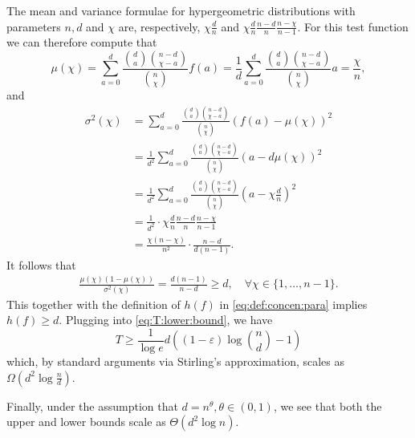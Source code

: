 \documentclass[onecolumn,letterpaper]{IEEEtran}
\newcommand{\na}{{a}}
\newcommand{\plsize}{{\chi}}
\newcommand{\mean}{{\mu}}
\newcommand{\var}{{\sigma^{2}}}
\newcommand{\fh}{{h(f)}}
\begin{document}
\begin{IEEEproof}
The mean and variance formulae for hypergeometric distributions with parameters $n, d$ and $\plsize$ are, respectively, $\plsize \frac d n$  and $\plsize \frac {d} {n}\frac {n-d} {n}\frac {n-\plsize} {n-1}$.
For this test function we can therefore compute that 
\begin{equation*}
    \mean(\plsize) = \sum\limits_{\na=0}^{d} \frac{\binom{d}{\na}\binom{n-d}{\plsize-\na}}{\binom{n}{\plsize}} f(\na) = \frac{1}{d} \sum\limits_{\na=0}^{d} \frac{\binom{d}{\na}\binom{n-d}{\plsize-\na}}{\binom{n}{\plsize}} \na = \frac{\plsize}{n},
\end{equation*}
and 
\begin{align*}
    \var(\plsize) &= \sum\limits_{\na=0}^{d} \frac{\binom{d}{\na}\binom{n-d}{\plsize-\na}}{\binom{n}{\plsize}} (f(\na) - \mean(\plsize))^2 \\ 
    &= \frac{1}{d^2}\sum\limits_{\na=0}^{d} \frac{\binom{d}{\na}\binom{n-d}{\plsize-\na}}{\binom{n}{\plsize}} \left( \na-d\mean(\plsize) \right)^2 \\ 
    &= \frac{1}{d^2}\sum\limits_{\na=0}^{d} \frac{\binom{d}{\na}\binom{n-d}{\plsize-\na}}{\binom{n}{\plsize}} \left( \na - \plsize\frac d n \right)^2 \\     
    &= \frac{1}{d^2} \cdot\plsize \frac {d} {n}\frac {n-d} {n}\frac {n-\plsize} {n-1} \\
    &=\frac{\plsize(n-\plsize)}{n^2}\cdot \frac{n-d}{d(n-1)}.
\end{align*}
It follows that 
\begin{align*}
    \frac{\mean(\plsize)(1-\mean(\plsize))}{\var(\plsize)}= \frac{d(n-1)}{n-d} 
    \ge d, \quad \forall\plsize\in\{1,\dots,n-1\}.
\end{align*}
This together with the definition of $\fh$ in \eqref{eq:def:concen:para} implies $\fh\geq d$. 
Plugging into \eqref{eq:T:lower:bound}, we have
\begin{equation*}
    T \geq \frac{1}{\log e} d \left( (1-\varepsilon)\log\binom{n}{d} - 1 \right) 
\end{equation*}
which, by standard arguments via Stirling’s approximation, scales as $ \Omega \left( d^2 \log \frac{n}{d}  \right)$.

Finally, under the assumption that $ d= n^{\theta},\theta\in(0,1)$, we see that both the upper and lower bounds scale as  $ \Theta \left( d^2 \log n  \right)$.


\end{IEEEproof}
\end{document}
